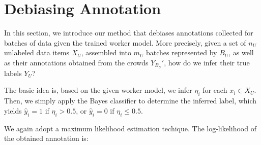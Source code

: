 
\section{Debiasing Annotation}
\label{sec:debias}

In this section, we introduce our method that debiases
annotations collected for batches of
data given the trained worker model.
More precisely, given a set of $n_U$ unlabeled data items $X_U$,
assembled into $m_U$ batches represented by $B_U$,
as well as their annotations obtained from the crowds $Y_{B_U}'$,
how do we infer their true labels $Y_U$?

The basic idea is, based on the given worker model,
we infer $\eta_i$ for each $x_i \in X_U$.
Then, we 
 simply apply the Bayes classifier to determine the inferred label,
which yields $\hat{y}_i = 1$ if $\eta_i > 0.5$, or $\hat{y}_i = 0$ if $\eta_i \leq 0.5$.

We again adopt a maximum likelihood estimation techique.
The log-likelihood of the obtained annotation is:
%

